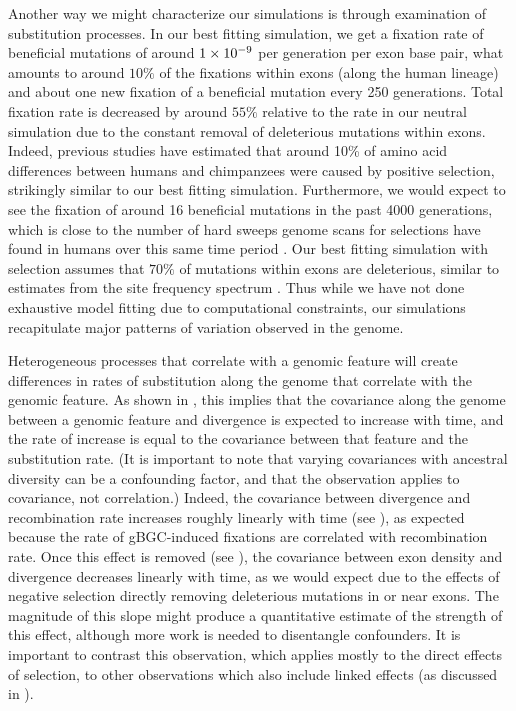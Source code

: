 Another way we might characterize our simulations is 
through examination of substitution processes.
In our best fitting simulation, 
we get a fixation rate of beneficial mutations of around ${1}\times10^{-9}$ per generation per exon base pair,
what amounts to around $10\%$ of the fixations within exons (along the human lineage) and
about one new fixation of a beneficial mutation every 250 generations.
Total fixation rate is decreased by around $55\%$ relative to the rate in our neutral simulation due to the constant removal of deleterious mutations within exons.
Indeed, previous studies \citep{boyko_assessing_2008} have estimated that around 10\% of amino acid differences between humans and chimpanzees were caused by positive selection,
strikingly similar to our best fitting simulation.
Furthermore, we would expect to see the fixation of around 16 beneficial mutations in the past 4000 generations,
which is close to the number of hard sweeps genome scans for selections have found in humans over this same time period \citep{schrider_soft_2017, schrider_shic_2016}.
Our best fitting simulation with selection assumes that $70\%$ of mutations within exons are deleterious,
similar to estimates from the site frequency spectrum \citep{boyko_assessing_2008,kim_inference_2017, huber_determining_2017}.
Thus while we have not done exhaustive model fitting due to computational constraints, our simulations recapitulate
major patterns of variation observed in the genome.

Heterogeneous processes that correlate with a genomic feature
will create differences in rates of substitution along the genome
that correlate with the genomic feature.
As shown in , this implies that 
the covariance along the genome between a genomic feature and divergence
is expected to increase with time,
and the rate of increase is
equal to the covariance between that feature and the substitution rate.
(It is important to note that
varying covariances with ancestral diversity can be a confounding factor,
and that the observation applies to covariance, not correlation.)
Indeed,
the covariance between divergence and recombination rate increases roughly linearly with time
(see ),
as expected because the rate of gBGC-induced fixations are correlated with recombination rate.
Once this effect is removed (see ),
the covariance between exon density and divergence decreases linearly with time,
as we would expect due to the effects of negative selection directly removing deleterious mutations
in or near exons.
The magnitude of this slope might produce a quantitative estimate
of the strength of this effect,
although more work is needed to disentangle confounders.
It is important to contrast this observation,
which applies mostly to the direct effects of selection,
to other observations which also include linked effects
(as discussed in \citet{phung_determining_2016}).


